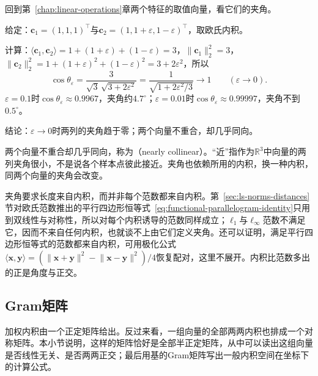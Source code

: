 回到第~\ref{chap:linear-operations}章两个特征的取值向量，看它们的夹角。
\begin{example}[贯穿例两列的夹角]
\label{ex:ls-nearly-collinear-angle}
给定：$\bm c_1=(1,1,1)^\top$与$\bm c_2=(1,1+\varepsilon,1-\varepsilon)^\top$，取欧氏内积。

计算：$\langle\bm c_1,\bm c_2\rangle=1+(1+\varepsilon)+(1-\varepsilon)=3$，$\lVert\bm c_1\rVert_2^2=3$，$\lVert\bm c_2\rVert_2^2=1+(1+\varepsilon)^2+(1-\varepsilon)^2=3+2\varepsilon^2$，所以
\begin{equation}
 \cos\theta_\varepsilon=\frac{3}{\sqrt3\,\sqrt{3+2\varepsilon^2}}
 =\frac{1}{\sqrt{1+2\varepsilon^2/3}}\longrightarrow1\qquad(\varepsilon\to0).
 \label{eq:linear-algebra-nearly-collinear-angle}
\end{equation}
$\varepsilon=0.1$时$\cos\theta_\varepsilon\approx0.9967$，夹角约$4.7^\circ$；$\varepsilon=0.01$时$\cos\theta_\varepsilon\approx0.99997$，夹角不到$0.5^\circ$。

结论：$\varepsilon\to0$时两列的夹角趋于零；两个向量不重合，却几乎同向。
\end{example}
两个向量不重合却几乎同向，称为（nearly collinear）。“近”指作为$\mathbb R^3$中向量的两列夹角很小，不是说各个样本点彼此接近。夹角也依赖所用的内积，换一种内积，同两个向量的夹角会改变。

夹角要求长度来自内积，而并非每个范数都来自内积。第~\ref{sec:ls-norms-distances}节对欧氏范数推出的平行四边形恒等式~\eqref{eq:functional-parallelogram-identity}只用到双线性与对称性，所以对每个内积诱导的范数同样成立；$\ell_1$与$\ell_\infty$范数不满足它，因而不来自任何内积，也就谈不上由它们定义夹角。还可以证明，满足平行四边形恒等式的范数都来自内积，可用极化公式$\langle\bm x,\bm y\rangle=(\lVert\bm x+\bm y\rVert^2-\lVert\bm x-\bm y\rVert^2)/4$恢复配对，这里不展开。内积比范数多出的正是角度与正交。

\subsection{Gram矩阵}
\label{sec:ls-gram-psd}

加权内积由一个正定矩阵给出。反过来看，一组向量的全部两两内积也排成一个对称矩阵。本小节说明，这样的矩阵恰好是全部半正定矩阵，从中可以读出这组向量是否线性无关、是否两两正交；最后用基的Gram矩阵写出一般内积空间在坐标下的计算公式。

